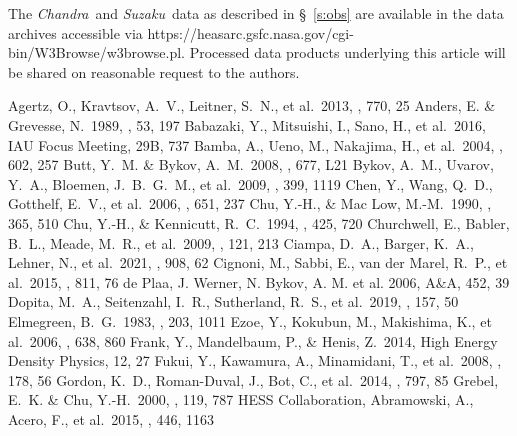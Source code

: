 \documentclass[usenatbib]{mnras}
\def\suzaku{{\sl Suzaku}}
\def\chandra{{\sl Chandra}}
\begin{document}
The \chandra\ and \suzaku\  data as described in \S~\ref{s:obs} are available in the data archives accessible via https://heasarc.gsfc.nasa.gov/cgi-bin/W3Browse/w3browse.pl. Processed data products underlying this article will be shared on reasonable request to the authors.
\begin{thebibliography}{}
Agertz, O., Kravtsov, A.~V., Leitner, S.~N., et al.\ 2013, \apj, 770, 25
Anders, E. \& Grevesse, N.\ 1989, \gca, 53, 197
Babazaki, Y., Mitsuishi, I., Sano, H., et al.\ 2016, IAU Focus Meeting, 29B, 737
Bamba, A., Ueno, M., Nakajima, H., et al.\ 2004, \apj, 602, 257
Butt, Y.~M. \& Bykov, A.~M.\ 2008, \apjl, 677, L21
Bykov, A.~M., Uvarov, Y.~A., Bloemen, J.~B.~G.~M., et al.\ 2009, \mnras, 399, 1119
Chen, Y., Wang, Q.~D., Gotthelf, E.~V., et al.\ 2006, \apj, 651, 237
Chu, Y.-H., \& Mac Low, M.-M.\ 1990, \apj, 365, 510
Chu, Y.-H., \& Kennicutt, R.~C.\ 1994, \apj, 425, 720
Churchwell, E., Babler, B.~L., Meade, M.~R., et al.\ 2009, \pasp, 121, 213
 Ciampa, D.~A., Barger, K.~A., Lehner, N., et al.\ 2021, \apj, 908, 62
Cignoni, M., Sabbi, E., van der Marel, R.~P., et al.\ 2015, \apj, 811, 76
de Plaa, J. Werner, N. Bykov, A. M. et al. 2006, A\&A, 452, 39
 Dopita, M.~A., Seitenzahl, I.~R., Sutherland, R.~S., et al.\ 2019, \aj, 157, 50
Elmegreen, B.~G.\ 1983, \mnras, 203, 1011
Ezoe, Y., Kokubun, M., Makishima, K., et al.\ 2006, \apj, 638, 860
Frank, Y., Mandelbaum, P., \& Henis, Z.\ 2014, High Energy Density Physics, 12, 27
Fukui, Y., Kawamura, A., Minamidani, T., et al.\ 2008, \apjs, 178, 56
Gordon, K.~D., Roman-Duval, J., Bot, C., et al.\ 2014, \apj, 797, 85
Grebel, E.~K. \& Chu, Y.-H.\ 2000, \aj, 119, 787
HESS Collaboration, Abramowski, A., Acero, F., et al.\ 2015, \mnras, 446, 1163

\end{thebibliography}
\end{document}
